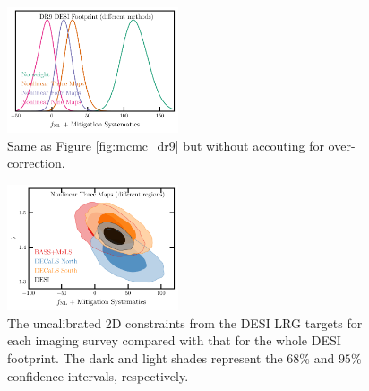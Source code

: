 \begin{figure}
    \centering
    \includegraphics[width=0.45\textwidth]{figures/mcmc_dr9methods1dnoshift.pdf}
    \caption{Same as Figure \ref{fig:mcmc_dr9} but without accouting for over-correction. }
    \label{fig:mcmcdr9noshift}
\end{figure}
\begin{figure}
    \centering
    \includegraphics[width=0.45\textwidth]{figures/mcmc_dr9regions.pdf} 
    \caption{The uncalibrated 2D constraints from the DESI LRG targets for each imaging survey compared with that for the whole DESI footprint. The dark and light shades represent the $68\%$ and $95\%$ confidence intervals, respectively.}\label{fig:mcmc_dr9reg}
\end{figure}
